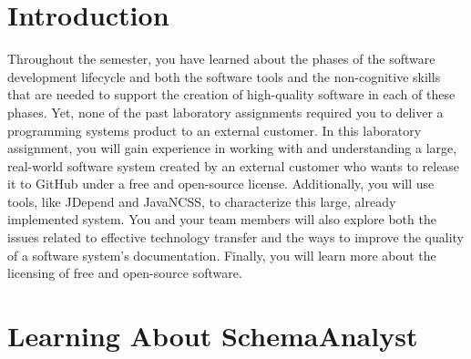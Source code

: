 

\usepackage[compact]{titlesec}

\usepackage[url=false,
    backend=biber,
    style=authoryear,
    doi=false,
    isbn=false,
    backref=false,
    dashed=false,                                   %
    maxnames=99,                                    %
    sorting=ydnt]{biblatex}                         %





\vspace*{-.1in}
\section*{Introduction}

\nocite{*}

Throughout the semester, you have learned about the phases of the software development lifecycle and both the software
tools and the non-cognitive skills that are needed to support the creation of high-quality software in each of these
phases. Yet, none of the past laboratory assignments required you to deliver a programming systems product to an
external customer. In this laboratory assignment, you will gain experience in working with and understanding a large,
real-world software system created by an external customer who wants to release it to GitHub under a free and
open-source license. Additionally, you will use tools, like JDepend and JavaNCSS, to characterize this large, already
implemented system. You and your team members will also explore both the issues related to effective technology transfer
and the ways to improve the quality of a software system's documentation. Finally, you will learn more about the
licensing of free and open-source software.

\vspace*{-.05in}
\section*{Learning About SchemaAnalyst}

